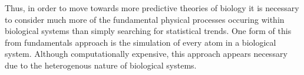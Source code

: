 Thus, in order to move towards more predictive theories of biology it is necessary to consider much more of the fundamental physical processes occuring within biological systems than simply searching for statistical trends. One form of this from fundamentals approach is the simulation of every atom in a biological system. Although computationally expensive, this approach appears necessary due to the heterogenous nature of biological systems. 

 

